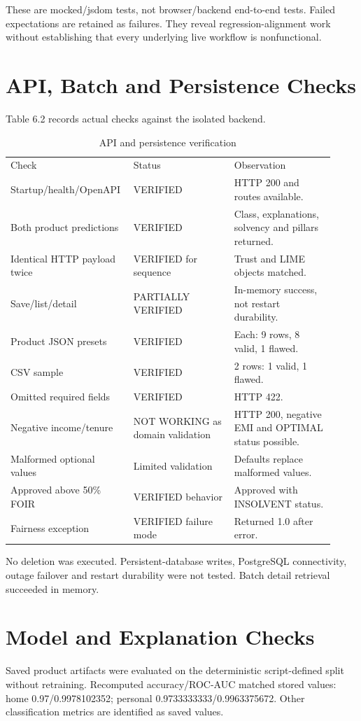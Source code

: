 \documentclass[12pt,a4paper]{report}
\begin{document}
These are mocked/jsdom tests, not browser/backend end-to-end tests. Failed expectations are retained as failures. They reveal regression-alignment work without establishing that every underlying live workflow is nonfunctional.

\section{API, Batch and Persistence Checks}
Table 6.2 records actual checks against the isolated backend.

\begin{longtable}{p{0.307\linewidth}p{0.307\linewidth}p{0.307\linewidth}}
\caption{API and persistence verification}\\

Check & Status & Observation\\
Startup/health/OpenAPI & VERIFIED & HTTP 200 and routes available.\\
Both product predictions & VERIFIED & Class, explanations, solvency and pillars returned.\\
Identical HTTP payload twice & VERIFIED for sequence & Trust and LIME objects matched.\\
Save/list/detail & PARTIALLY VERIFIED & In-memory success, not restart durability.\\
Product JSON presets & VERIFIED & Each: 9 rows, 8 valid, 1 flawed.\\
CSV sample & VERIFIED & 2 rows: 1 valid, 1 flawed.\\
Omitted required fields & VERIFIED & HTTP 422.\\
Negative income/tenure & NOT WORKING as domain validation & HTTP 200, negative EMI and OPTIMAL status possible.\\
Malformed optional values & Limited validation & Defaults replace malformed values.\\
Approved above 50\% FOIR & VERIFIED behavior & Approved with INSOLVENT status.\\
Fairness exception & VERIFIED failure mode & Returned 1.0 after error.\\
\end{longtable}
No deletion was executed. Persistent-database writes, PostgreSQL connectivity, outage failover and restart durability were not tested. Batch detail retrieval succeeded in memory.

\section{Model and Explanation Checks}
Saved product artifacts were evaluated on the deterministic script-defined split without retraining. Recomputed accuracy/ROC-AUC matched stored values: home 0.97/0.9978102352; personal 0.9733333333/0.9963375672. Other classification metrics are identified as saved values.
\end{document}
